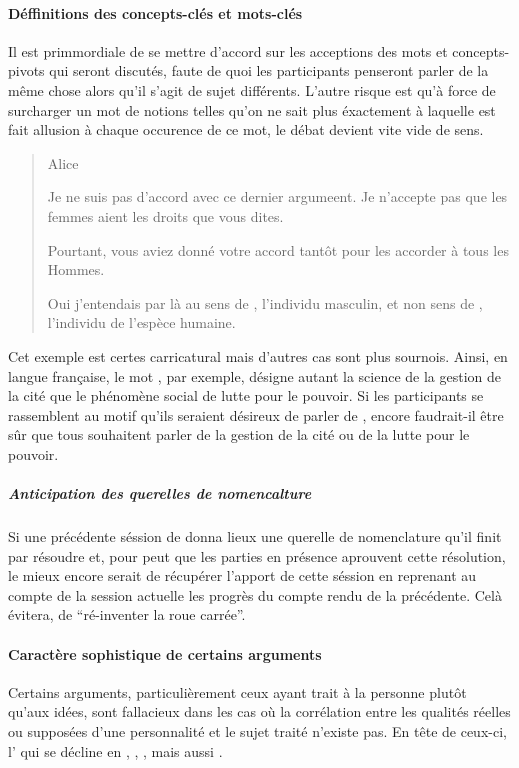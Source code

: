 \paragraph{Déffinitions des concepts-clés et mots-clés}
Il est primmordiale de se mettre d’accord sur les acceptions des mots et concepts-pivots qui seront discutés, faute de quoi les participants penseront parler de la même chose alors qu’il s’agit de sujet différents. L’autre risque est qu’à force de surcharger un mot de notions telles qu’on ne sait plus éxactement à laquelle est fait allusion à chaque occurence de ce mot, le débat devient vite vide de sens.

\begin{quote}
  \begin{drama}{0cm}{0cm}{Alice}

    \Aspeaks Je ne suis pas d’accord avec ce dernier argumeent. Je n’accepte pas que les femmes aient les droits que vous dites.

    \Bspeaks Pourtant, vous aviez donné votre accord tantôt pour les accorder à tous les Hommes.

    \Aspeaks Oui j’entendais par là  au sens de , l’individu masculin, et non  sens de , l’individu de l’espèce humaine.

  \end{drama}
\end{quote}

Cet exemple est certes carricatural mais d’autres cas sont plus sournois. Ainsi, en langue française, le mot , par exemple, désigne autant la science de la gestion de la cité que le phénomène social de lutte pour le pouvoir. Si les participants se rassemblent au motif qu’ils seraient désireux de parler de , encore faudrait-il être sûr que tous souhaitent parler de la gestion de la cité ou de la lutte pour le pouvoir.

\subparagraph{Anticipation des querelles de nomencalture}
Si une précédente séssion de \mainabbr{} donna lieux une querelle de nomenclature qu’il finit par résoudre et, pour peut que les parties en présence aprouvent cette résolution, le mieux encore serait de récupérer l’apport de cette séssion en reprenant au compte de la session actuelle les progrès du compte rendu de la précédente. Celà évitera, de \enquote{ré-inventer la roue carrée}.

\paragraph{Caractère sophistique de certains arguments}
Certains arguments, particulièrement ceux ayant trait à la personne plutôt qu’aux idées, sont fallacieux dans les cas où la corrélation entre les qualités réelles ou supposées d’une personnalité et le sujet traité n’existe pas. En tête de ceux-ci, l’ qui se décline en , , , mais aussi .

